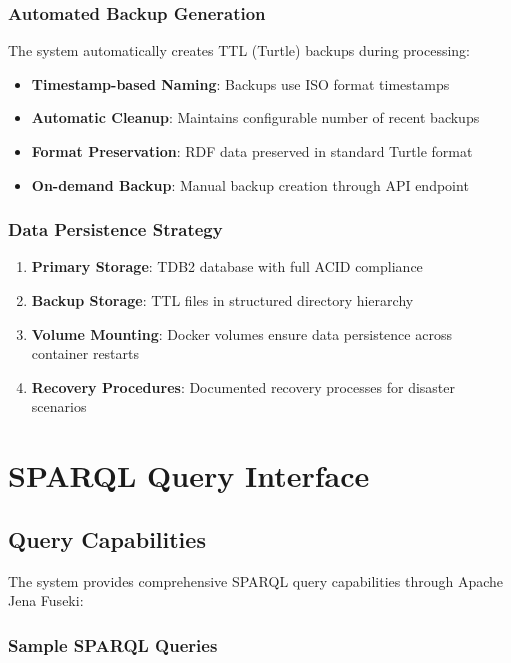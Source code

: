 \documentclass[12pt,a4paper]{article}
\begin{document}
\subsubsection{Automated Backup Generation}

The system automatically creates TTL (Turtle) backups during processing:

\begin{itemize}
    \item \textbf{Timestamp-based Naming}: Backups use ISO format timestamps
    \item \textbf{Automatic Cleanup}: Maintains configurable number of recent backups
    \item \textbf{Format Preservation}: RDF data preserved in standard Turtle format
    \item \textbf{On-demand Backup}: Manual backup creation through API endpoint
\end{itemize}

\subsubsection{Data Persistence Strategy}

\begin{enumerate}
    \item \textbf{Primary Storage}: TDB2 database with full ACID compliance
    \item \textbf{Backup Storage}: TTL files in structured directory hierarchy
    \item \textbf{Volume Mounting}: Docker volumes ensure data persistence across container restarts
    \item \textbf{Recovery Procedures}: Documented recovery processes for disaster scenarios
\end{enumerate}

\section{SPARQL Query Interface}

\subsection{Query Capabilities}

The system provides comprehensive SPARQL query capabilities through Apache Jena Fuseki:

\subsubsection{Sample SPARQL Queries}
\end{document}
